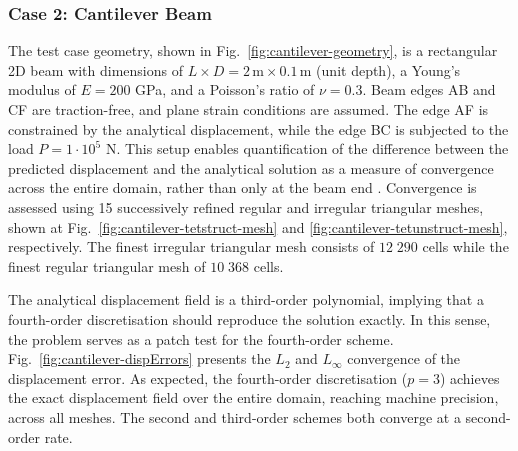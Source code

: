 \documentclass[review,3p]{elsarticle}
\begin{document}
\subsubsection{Case 2: Cantilever Beam}
%
The test case geometry, shown in Fig.~\ref{fig:cantilever-geometry}, is a rectangular 2D beam with dimensions of $L\times D=2\,\text{m}\times0.1\,\text{m}$ (unit depth), a Young’s modulus of $E = 200$ GPa, and a Poisson’s ratio of $\nu = 0.3$. Beam edges AB and CF are traction-free, and plane strain conditions are assumed. The edge AF is constrained by the analytical displacement, while the edge BC is subjected to the load $P=1 \cdot 10^{5}$ N. This setup enables quantification of the difference between the predicted displacement and the analytical solution as a measure of convergence across the entire domain, rather than only at the beam end \cite{augarde2008}. Convergence is assessed using 15 successively refined regular and irregular triangular meshes, shown at Fig.~\ref{fig:cantilever-tetstruct-mesh} and \ref{fig:cantilever-tetunstruct-mesh}, respectively. The finest irregular triangular mesh consists of $12\;290$ cells while the finest regular triangular mesh of $10\;368$ cells.
%

The analytical displacement field is a third-order polynomial, implying that a fourth-order discretisation should reproduce the solution exactly. In this sense, the problem serves as a patch test for the fourth-order scheme. Fig.~\ref{fig:cantilever-dispErrors} presents the $L_2$ and $L_\infty$ convergence of the displacement error. As expected, the fourth-order discretisation ($p=3$) achieves the exact displacement field over the entire domain, reaching machine precision, across all meshes. The second and third-order schemes both converge at a second-order rate.
\end{document}
